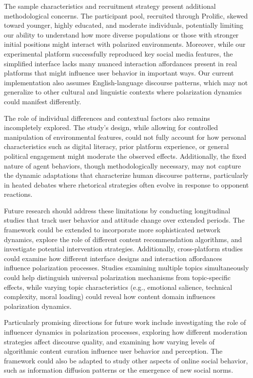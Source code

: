 The sample characteristics and recruitment strategy present additional methodological concerns. The participant pool, recruited through Prolific, skewed toward younger, highly educated, and moderate individuals, potentially limiting our ability to understand how more diverse populations or those with stronger initial positions might interact with polarized environments. Moreover, while our experimental platform successfully reproduced key social media features, the simplified interface lacks many nuanced interaction affordances present in real platforms that might influence user behavior in important ways. Our current implementation also assumes English-language discourse patterns, which may not generalize to other cultural and linguistic contexts where polarization dynamics could manifest differently.

The role of individual differences and contextual factors also remains incompletely explored. The study's design, while allowing for controlled manipulation of environmental features, could not fully account for how personal characteristics such as digital literacy, prior platform experience, or general political engagement might moderate the observed effects. Additionally, the fixed nature of agent behaviors, though methodologically necessary, may not capture the dynamic adaptations that characterize human discourse patterns, particularly in heated debates where rhetorical strategies often evolve in response to opponent reactions.

Future research should address these limitations by conducting longitudinal studies that track user behavior and attitude change over extended periods. The framework could be extended to incorporate more sophisticated network dynamics, explore the role of different content recommendation algorithms, and investigate potential intervention strategies. Additionally, cross-platform studies could examine how different interface designs and interaction affordances influence polarization processes. Studies examining multiple topics simultaneously could help distinguish universal polarization mechanisms from topic-specific effects, while varying topic characteristics (e.g., emotional salience, technical complexity, moral loading) could reveal how content domain influences polarization dynamics.

Particularly promising directions for future work include investigating the role of influencer dynamics in polarization processes, exploring how different moderation strategies affect discourse quality, and examining how varying levels of algorithmic content curation influence user behavior and perception. The framework could also be adapted to study other aspects of online social behavior, such as information diffusion patterns or the emergence of new social norms.